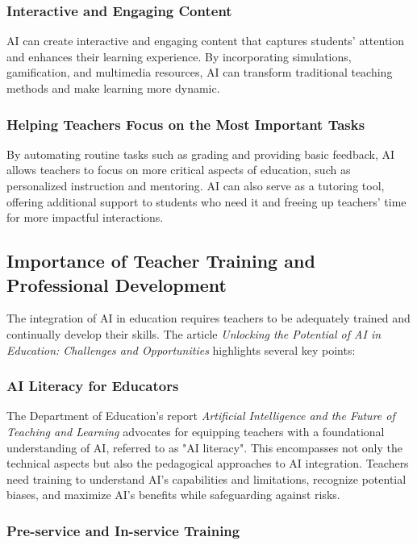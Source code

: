 \documentclass{article}
\begin{document}
\subsubsection{Interactive and Engaging Content}

AI can create interactive and engaging content that captures students'
attention and enhances their learning experience.
By incorporating simulations, gamification, and multimedia resources,
AI can transform traditional teaching methods and make learning more dynamic.

\subsubsection{Helping Teachers Focus on the Most Important Tasks}

By automating routine tasks such as grading and providing basic feedback,
AI allows teachers to focus on more critical aspects of education,
such as personalized instruction and mentoring.
AI can also serve as a tutoring tool, offering additional
support to students who need it and freeing up teachers' time
for more impactful interactions.

\subsection{Importance of Teacher Training and Professional Development}

The integration of AI in education requires teachers to be adequately
trained and continually develop their skills.
The article \cite{Rashmi2023Unlocking}
\textit{Unlocking the Potential of AI in Education: Challenges and Opportunities}
highlights several key points:

\subsubsection{AI Literacy for Educators}

The Department of Education's report
\textit{Artificial Intelligence and the Future of Teaching and Learning}
\cite{usde2023ai} advocates for equipping teachers with a foundational
understanding of AI, referred to as "AI literacy".
This encompasses not only the technical aspects but also the
pedagogical approaches to AI integration. Teachers need training
to understand AI's capabilities and limitations, recognize potential biases,
and maximize AI's benefits while safeguarding against risks.

\subsubsection{Pre-service and In-service Training}
\end{document}
